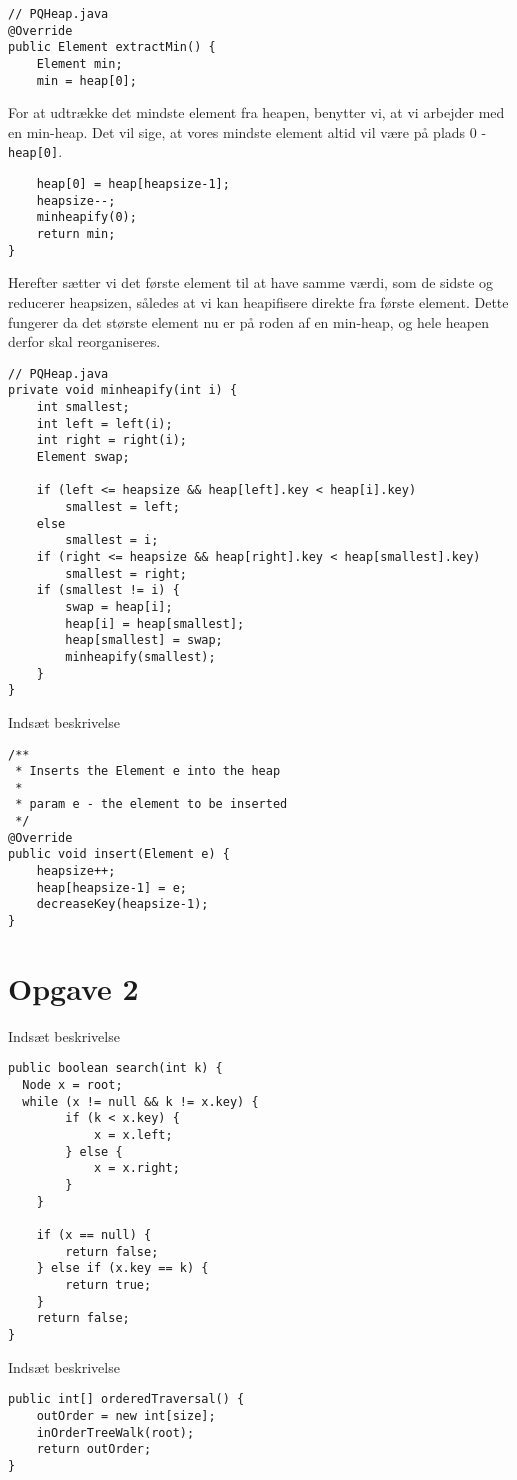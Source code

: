 \documentclass{article}
\begin{document}
\begin{lstlisting}
// PQHeap.java
@Override
public Element extractMin() {
    Element min;
    min = heap[0];    
\end{lstlisting}
For at udtrække det mindste element fra heapen, benytter vi, at vi arbejder med en min-heap. Det vil sige, at vores mindste element altid vil være på plads 0 - \texttt{heap[0]}.
\begin{lstlisting}    
    heap[0] = heap[heapsize-1];
    heapsize--;
    minheapify(0);
    return min;
}
\end{lstlisting}
Herefter sætter vi det første element til at have samme værdi, som de sidste og reducerer heapsizen, således at vi kan heapifisere direkte fra første element. Dette fungerer da det største element nu er på roden af en min-heap, og hele heapen derfor skal reorganiseres.
\begin{lstlisting}
// PQHeap.java
private void minheapify(int i) {
    int smallest;
    int left = left(i);
    int right = right(i);
    Element swap;

    if (left <= heapsize && heap[left].key < heap[i].key)
        smallest = left;
    else
        smallest = i;
    if (right <= heapsize && heap[right].key < heap[smallest].key)
        smallest = right;
    if (smallest != i) {
        swap = heap[i];
        heap[i] = heap[smallest];
        heap[smallest] = swap;
        minheapify(smallest);
    }
}
\end{lstlisting}


Indsæt beskrivelse
\begin{lstlisting}
/**
 * Inserts the Element e into the heap
 *
 * param e - the element to be inserted
 */
@Override
public void insert(Element e) {
    heapsize++;
    heap[heapsize-1] = e;
    decreaseKey(heapsize-1);
}
\end{lstlisting}


\newpage


\section*{Opgave 2}
Indsæt beskrivelse
\begin{lstlisting}
public boolean search(int k) {
  Node x = root;
  while (x != null && k != x.key) {
        if (k < x.key) {
            x = x.left;
        } else {
            x = x.right;
        }
    }

    if (x == null) {
        return false;
    } else if (x.key == k) {
        return true;
    }
    return false;
}
\end{lstlisting}
Indsæt beskrivelse
\begin{lstlisting}
public int[] orderedTraversal() {
    outOrder = new int[size];
    inOrderTreeWalk(root);
    return outOrder;
}
\end{lstlisting}
\newpage
\end{document}

